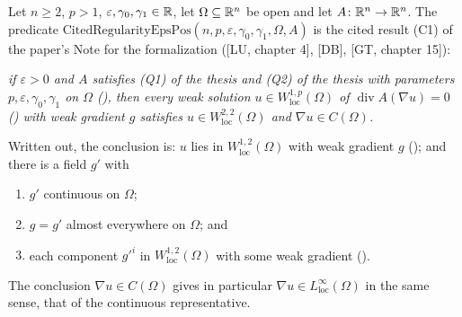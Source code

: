 \begin{definition}
Let $n\ge2$, $p>1$, $\varepsilon,\gamma_0,\gamma_1\in\mathbb{R}$, let
$\Omega\subseteq\mathbb{R}^n$ be open and let $A\colon\mathbb{R}^n\to\mathbb{R}^n$.  The predicate
$\mathrm{CitedRegularityEpsPos}(n,p,\varepsilon,\gamma_0,\gamma_1,\Omega,A)$ is the
cited result (C1) of the paper's Note for the formalization
([LU, chapter 4], [DB], [GT, chapter 15]):

\emph{if $\varepsilon>0$ and $A$ satisfies (Q1) of the thesis and (Q2) of the thesis with
parameters $p,\varepsilon,\gamma_0,\gamma_1$ on $\Omega$
(), then every weak solution
$u\in W^{1,p}_{\mathrm{loc}}(\Omega)$ of $\operatorname{div}A(\nabla u)=0$
() with weak gradient $g$ satisfies
$u\in W^{2,2}_{\mathrm{loc}}(\Omega)$ and $\nabla u\in C(\Omega)$.}

Written out, the conclusion is: $u$ lies in $W^{1,2}_{\mathrm{loc}}(\Omega)$
with weak gradient $g$ (); and there is a field $g'$ with
\begin{enumerate}
\item $g'$ continuous on $\Omega$;
\item $g=g'$ almost everywhere on $\Omega$; and
\item each component $g'^i$ in $W^{1,2}_{\mathrm{loc}}(\Omega)$ with some weak
  gradient ().
\end{enumerate}
The conclusion $\nabla u\in C(\Omega)$ gives in
particular $\nabla u\in L^\infty_{\mathrm{loc}}(\Omega)$ in the same sense, that
of the continuous representative.


\end{definition}
